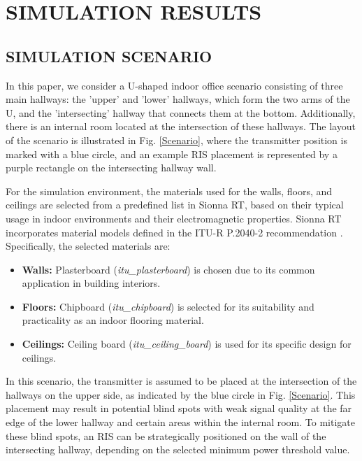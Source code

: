 \documentclass{IEEEoj}
\begin{document}
\section{SIMULATION RESULTS}

\subsection{SIMULATION SCENARIO}
In this paper, we consider a U-shaped indoor office scenario consisting of three main hallways: the 'upper' and 'lower' hallways, which form the two arms of the U, and the 'intersecting' hallway that connects them at the bottom. Additionally, there is an internal room located at the intersection of these hallways. The layout of the scenario is illustrated in Fig. \ref{Scenario}, where the transmitter position is marked with a blue circle, and an example RIS placement is represented by a purple rectangle on the intersecting hallway wall.

For the simulation environment, the materials used for the walls, floors, and ceilings are selected from a predefined list in Sionna RT, based on their typical usage in indoor environments and their electromagnetic properties. Sionna RT incorporates material models defined in the ITU-R P.2040-2 recommendation \cite{ITU}. Specifically, the selected materials are:  
\begin{itemize}
	\item \textbf{Walls:} Plasterboard (\textit{itu\_plasterboard}) is chosen due to its common application in building interiors.
	\item \textbf{Floors:} Chipboard (\textit{itu\_chipboard}) is selected for its suitability and practicality as an indoor flooring material.
	\item \textbf{Ceilings:} Ceiling board (\textit{itu\_ceiling\_board}) is used for its specific design for ceilings.
\end{itemize}

In this scenario, the transmitter is assumed to be placed at the intersection of the hallways on the upper side, as indicated by the blue circle in Fig. \ref{Scenario}. This placement may result in potential blind spots with weak signal quality at the far edge of the lower hallway and certain areas within the internal room. To mitigate these blind spots, an RIS can be strategically positioned on the wall of the intersecting hallway, depending on the selected minimum power threshold value.
\end{document}
